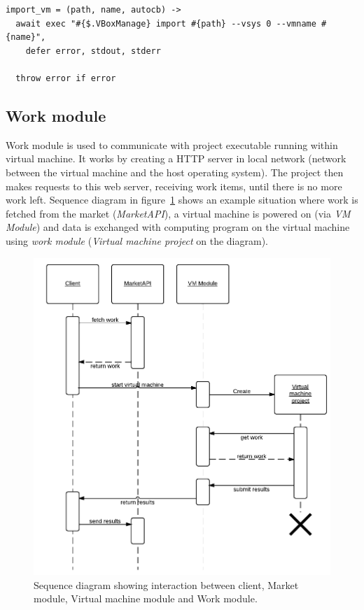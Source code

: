 \begin{lstlisting}[caption=Function wrapping \emph{vm import} method.]
import_vm = (path, name, autocb) ->
  await exec "#{$.VBoxManage} import #{path} --vsys 0 --vmname #{name}",
    defer error, stdout, stderr

  throw error if error
\end{lstlisting}

\subsection{Work module}

Work module is used to communicate with project executable running within virtual machine. It works by creating a HTTP server in local network (network between the virtual machine and the host operating system). The project then makes requests to this web server, receiving work items, until there is no more work left. Sequence diagram in figure~\ref{f:clientseq} shows an example situation where work is fetched from the market (\emph{MarketAPI}), a virtual machine is powered on (via \emph{VM Module}) and data is exchanged with computing program on the virtual machine using \emph{work module} (\emph{Virtual machine project} on the diagram).

\begin{figure}
\centering
\includegraphics{diagrams/ClientSequence.pdf}
\caption{Sequence diagram showing interaction between client, Market module, Virtual machine module and Work module.}
\label{f:clientseq}
\end{figure}

